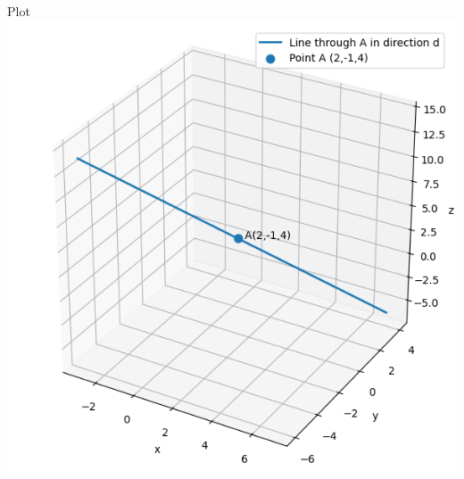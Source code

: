 \documentclass{beamer}
\begin{document}
\begin{frame}{Plot}
   \centering
   \includegraphics[width=\columnwidth, height=0.8\textheight, keepaspectratio]{beamer/figs/fig1.jpg}
   \label{fig:Beamer/figs/fig1.png}
\end{frame}
\end{document}
